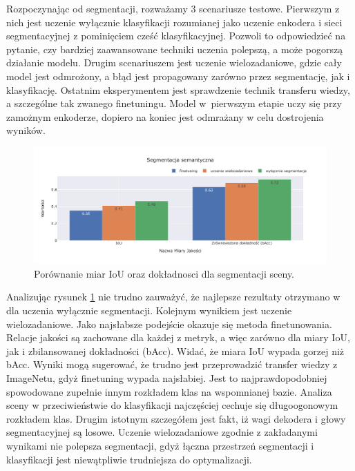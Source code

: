 \vspace{0.5cm}
Rozpoczynając od segmentacji, rozważamy 3 scenariusze testowe. Pierwszym z nich jest uczenie wyłącznie klasyfikacji rozumianej jako uczenie enkodera i sieci segmentacyjnej z pominięciem cześć klasyfikacyjnej. Pozwoli to odpowiedzieć na pytanie, czy bardziej zaawansowane techniki uczenia polepszą, a może pogorszą działanie modelu. Drugim scenariuszem jest uczenie wielozadaniowe, gdzie cały model jest odmrożony, a błąd jest propagowany zarówno przez segmentację, jak i klasyfikację. Ostatnim eksperymentem jest sprawdzenie technik transferu wiedzy, a szczególne tak zwanego finetuningu. Model w~pierwszym etapie uczy się przy zamożnym enkoderze, dopiero na koniec jest odmrażany w celu dostrojenia wyników.

\begin{figure}[ht!]
    \centering
    \includegraphics[width=\textwidth]{img/pl-res/Segmentacja-semantyczna.jpeg}
    \caption{Porównanie miar IoU oraz dokładnosci dla segmentacji sceny.}
    \label{fig:macro-segmentation}
\end{figure}

Analizując rysunek \ref{fig:macro-segmentation} nie trudno zauważyć, że najlepsze rezultaty otrzymano w dla uczenia wyłącznie segmentacji. Kolejnym wynikiem jest uczenie wielozadaniowe. Jako najsłabsze podejście okazuje się metoda finetunowania. Relacje jakości są zachowane dla każdej z metryk, a więc zarówno dla miary IoU, jak i zbilansowanej dokładności (bAcc). Widać, że miara IoU wypada gorzej niż bAcc. Wyniki mogą sugerować, że trudno jest przeprowadzić transfer wiedzy z ImageNetu, gdyż finetuning wypada najsłabiej. Jest to najprawdopodobniej spowodowane zupełnie innym rozkładem klas na wspomnianej bazie. Analiza sceny w przeciwieństwie do klasyfikacji najczęściej cechuje się długoogonowym rozkładem klas. Drugim istotnym szczegółem jest fakt, iż wagi dekodera i głowy segmentacyjnej są losowe. Uczenie wielozadaniowe zgodnie z zakładanymi wynikami nie polepsza segmentacji, gdyż łączna przestrzeń segmentacji i klasyfikacji jest niewątpliwie trudniejsza do optymalizacji.

